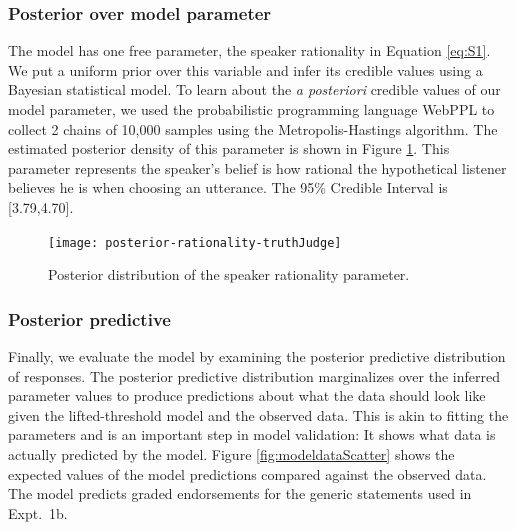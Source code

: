 \documentclass[10pt,letterpaper]{article}
\begin{document}
\subsubsection{Posterior over model parameter}

The model has one free parameter, the speaker rationality in Equation \ref{eq:S1}. 
We put a uniform prior over this variable and infer its credible values using a Bayesian statistical model. 
To learn about the \emph{a posteriori} credible values of our model parameter, we used the probabilistic programming language WebPPL \cite{dippl} to collect 2 chains of 10,000 samples using the Metropolis-Hastings algorithm. 
The estimated posterior density of this parameter is shown in Figure \ref{fig:rationality}. 
This parameter represents the speaker's belief is how rational the hypothetical listener believes he is when choosing an utterance. 
The 95\% Credible Interval is [3.79,4.70].

\begin{figure}
\centering
    \texttt{[image: posterior-rationality-truthJudge]}
    \caption{Posterior distribution of the speaker rationality parameter.}
  \label{fig:rationality}
\end{figure}


\subsubsection{Posterior predictive}

Finally, we evaluate the model by examining the posterior predictive distribution of responses. The posterior predictive distribution marginalizes over the inferred parameter values to produce predictions about what the data should look like given the lifted-threshold model and the observed data. This is akin to fitting the parameters and is an important step in model validation: It shows what data is actually predicted by the model. 
Figure \ref{fig:modeldataScatter} shows the expected values of the model predictions compared against the observed data. 
The model predicts graded endorsements for the generic statements used in Expt.~1b. 
\end{document}
